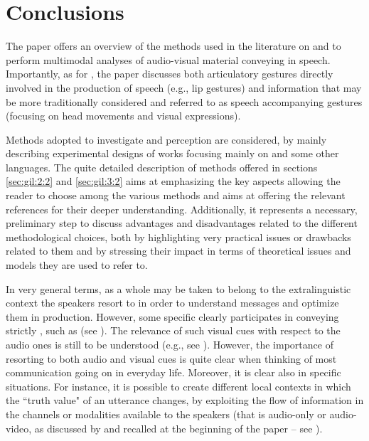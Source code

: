 \documentclass[output=paper]{langsci/langscibook}
\begin{document}
\section{Conclusions}\label{sec:gil:4}
The paper offers an overview of the methods used in the literature on  and  to perform multimodal analyses of audio-visual material conveying  in speech. Importantly, as for , the paper discusses both articulatory gestures directly involved in the production of speech (e.g., lip gestures) and information that may be more traditionally considered and referred to as speech accompanying gestures (focusing on head movements and visual expressions). 

Methods adopted to investigate  and perception are considered, by mainly describing experimental designs of works focusing mainly on  and some other  languages. The quite detailed description of methods offered in sections \ref{sec:gil:2:2} and \ref{sec:gil:3:2} aims at emphasizing the key aspects allowing the reader to choose among the various methods and aims at offering the relevant references for their deeper understanding.  Additionally, it represents a necessary, preliminary step to discuss advantages and disadvantages related to the different methodological choices, both by highlighting very practical issues or drawbacks related to them and by stressing their impact in terms of theoretical issues and models they are used to refer to.

In very general terms,  as a whole may be taken to belong to the extralinguistic context the speakers resort to in order to understand messages and optimize them in production. However, some specific  clearly participates in conveying strictly , such as  (see ). The relevance of such visual cues with respect to the audio ones is still to be understood (e.g., see ). However, the importance of resorting to both audio and visual cues is quite clear when thinking of most communication going on in everyday life. Moreover, it is clear also in specific situations. For instance, it is possible to create different local contexts in which the ``truth value" of an utterance changes, by exploiting the flow of information in the channels or modalities available to the speakers (that is audio-only or audio-video, as discussed by \citealt{GiliFivela2014} and recalled at the beginning of the paper -- see ). 
\end{document}
